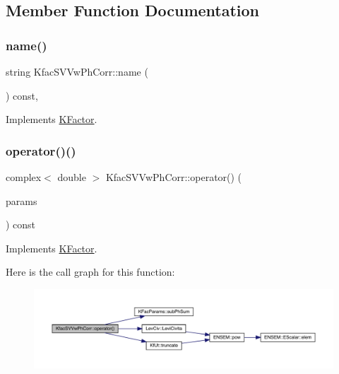 \subsection{Member Function Documentation}
\mbox{\label{classKfacSVVwPhCorr_a390641d2f2f421a4d91caceff42d53e8}} 
\subsubsection{\texorpdfstring{name()}{name()}}
{\footnotesize\ttfamily string Kfac\+S\+V\+Vw\+Ph\+Corr\+::name (\begin{DoxyParamCaption}{ }\end{DoxyParamCaption}) const\hspace{0.3cm}{\ttfamily [inline]}, {\ttfamily [virtual]}}



Implements \mbox{\hyperlink{classKFactor_ae578f8d6e4b525895427717da99cab6c}{K\+Factor}}.

\mbox{\label{classKfacSVVwPhCorr_a16ca2be4bad507ad67ab2ce96f056917}} 
\subsubsection{\texorpdfstring{operator()()}{operator()()}}
{\footnotesize\ttfamily complex$<$ double $>$ Kfac\+S\+V\+Vw\+Ph\+Corr\+::operator() (\begin{DoxyParamCaption}\item[{const \mbox{\hyperlink{classKFacParams}{K\+Fac\+Params}} \&}]{params }\end{DoxyParamCaption}) const\hspace{0.3cm}{\ttfamily [virtual]}}



Implements \mbox{\hyperlink{classKFactor_a4273897de4ef590083c7ef208b8d0f18}{K\+Factor}}.

Here is the call graph for this function\+:
\nopagebreak
\begin{figure}[H]
\begin{center}
\leavevmode
\includegraphics[width=350pt]{d5/dd2/classKfacSVVwPhCorr_a16ca2be4bad507ad67ab2ce96f056917_cgraph}
\end{center}
\end{figure}



